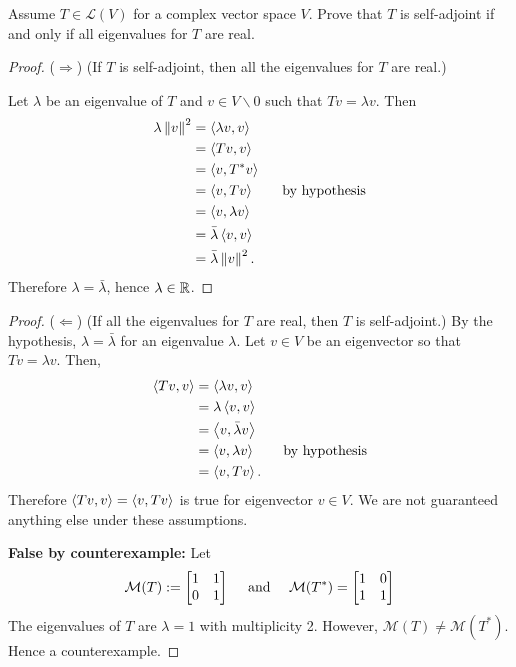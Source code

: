 Assume $T \in \mathcal{L}(V)$ for a complex vector space $V$.  Prove that $T$ is self-adjoint if and only if all eigenvalues for $T$ are real.
\vspace{0.3in}

\begin{proof} ($\Longrightarrow$) (If $T$ is self-adjoint, then all the eigenvalues for $T$ are real.)
    
    \nl Let $\lambda$ be an eigenvalue of $T$ and $v \in V\backslash0$ such that $Tv = \lambda v$. Then 
    \begin{align*}
        \lambda \left\| {v} \right\|^2 &= \left\langle{\lambda v, v}\right\rangle\\
        &= \left\langle{Tv, v}\right\rangle\\
        &= \left\langle{v, T^*v}\right\rangle\\
        &= \left\langle{v, Tv}\right\rangle \qquad \text{by hypothesis}\\
        &= \left\langle{v, \lambda v}\right\rangle\\
        &= \bar{\lambda} \left\langle{v,v}\right\rangle\\
        &= \bar{\lambda} \left\| {v} \right\|^2.
    \end{align*}
    Therefore $\lambda = \bar{\lambda}$, hence $\lambda \in \mathbb{R}$.
\end{proof}

\vspace{0.3in}

\begin{proof} ($\Longleftarrow$) (If all the eigenvalues for $T$ are real, then $T$ is self-adjoint.)
    By the hypothesis, $\lambda = \bar{\lambda}$ for an eigenvalue $\lambda$. Let $v \in V$ be an eigenvector so that $Tv = \lambda v$. Then,
    \begin{align*}
        \left\langle{Tv, v}\right\rangle &= \left\langle{\lambda v, v}\right\rangle\\
        &= \lambda \left\langle{v,v}\right\rangle \\
        &= \left\langle{v, \bar{\lambda} v}\right\rangle\\
        &= \left\langle{v, \lambda v}\right\rangle \qquad \text{by hypothesis}\\
        &= \left\langle{v, Tv}\right\rangle.
    \end{align*}
    Therefore $\left\langle{Tv, v}\right\rangle = \left\langle{v, Tv}\right\rangle$ is true for eigenvector $v \in V$. We are not guaranteed anything else under these assumptions.
    
    \nl \textbf{False by counterexample:} Let 
    $$\mathcal{M}(T) := \begin{bmatrix}{1} & {1}\\{0}&{1}\end{bmatrix} \quad\text{ and }\quad \mathcal{M}(T^*) = \begin{bmatrix}{1} & {0}\\{1}&{1}\end{bmatrix}$$
    The eigenvalues of $T$ are $\lambda = 1$ with multiplicity 2. However, $\mathcal{M}(T) \neq \mathcal{M}(T^*)$. Hence a counterexample.
\end{proof}


